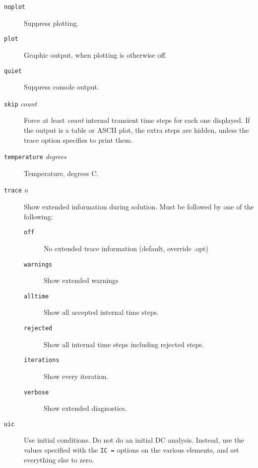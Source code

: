 \begin{description}



\item[{\tt noplot}]
Suppress plotting.

\item[{\tt plot}]
Graphic output, when plotting is otherwise off.

\item[{\tt quiet}]
Suppress console output.

\item[{\tt skip} {\it count}]
Force at least {\it count} internal transient time steps for each one
displayed.  If the output is a table or ASCII plot, the extra steps
are hidden, unless the trace option specifies to print them.


\item[{\tt temperature} {\it degrees}]
Temperature, degrees C.

\item[{\tt trace} {\it n}]
Show extended information during solution.
Must be followed by one of the following:
\begin{description}
\item[{\tt off}] No extended trace information (default, override .opt)
\item[{\tt warnings}] Show extended warnings
\item[{\tt alltime}] Show all accepted internal time steps.
\item[{\tt rejected}] Show all internal time steps including rejected steps.
\item[{\tt iterations}] Show every iteration.
\item[{\tt verbose}] Show extended diagnostics.
\end{description}

\item[{\tt uic}]
Use initial conditions.  Do not do an initial DC analysis.  Instead,
use the values specified with the {\tt IC =} options on the various
elements, and set everything else to zero.

\end{description}
